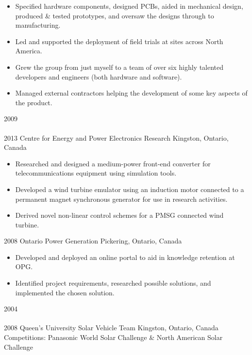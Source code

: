 \begin{entrylist}
{\begin{itemize}[leftmargin=12pt]
	\item Specified hardware components, designed PCBs, aided in mechanical design, produced \& tested prototypes, and oversaw the designs through to manufacturing.
  \item Led and supported the deployment of field trials at sites across North America.
	\item Grew the group from just myself to a team of over six highly talented developers and engineers (both hardware and software).
	\item Managed external contractors helping the development of some key aspects of the product.
\end{itemize}
}
\entry
  {2009\\\faChevronDown\\2013}
  {Centre for Energy and Power Electronics Research}
  {Kingston, Ontario, Canada}
  {
  \begin{itemize}[leftmargin=12pt]
    \item Researched and designed a medium-power front-end converter for telecommunications equipment using simulation tools.
    \item Developed a wind turbine emulator using an induction motor connected to a permanent magnet synchronous generator for use in research activities.
    \item Derived novel non-linear control schemes for a PMSG connected wind turbine.
  \end{itemize}}
\entry
  {2008}
  {Ontario Power Generation}
  {Pickering, Ontario, Canada}
  {
  \begin{itemize}[leftmargin=12pt]
    \item Developed and deployed an online portal to aid in knowledge retention at OPG.
    \item Identified project requirements, researched possible solutions, and implemented the chosen solution.
  \end{itemize}
}
\entry
  {2004\\\faChevronDown\\2008}
  {Queen's University Solar Vehicle Team}
  {Kingston, Ontario, Canada}
  {\\
  Competitions: {\bodyfontit Panasonic World Solar Challenge} \&
  {\bodyfontit North American Solar Challenge}
}
\end{entrylist}
